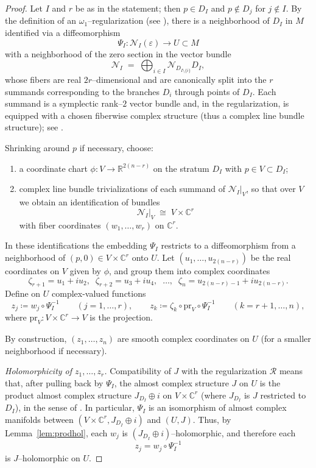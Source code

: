 \documentclass[11pt]{article}
\theoremstyle{definition}
\begin{document}
\begin{proof}
Let $I$ and $r$ be as in the statement; then $p\in D_I$ and $p\notin D_j$ for $j\notin I$.
By the definition of an $\omega_1$--regularization (see \cite[Definition~2.1]{FTZ}), there is a neighborhood of $D_I$ in $M$ identified via a diffeomorphism
\[
\Psi_I: \mathcal N_I(\varepsilon) \longrightarrow U\subset M
\]
with a neighborhood of the zero section in the vector bundle
\[
\mathcal N_I \;=\; \bigoplus_{i\in I} \mathcal N_{D_{I\setminus\{i\}}} D_I,
\]
whose fibers are real $2r$--dimensional and are canonically split into the $r$ summands corresponding to the branches $D_i$ through points of $D_I$.
Each summand is a symplectic rank--$2$ vector bundle and, in the regularization, is equipped with a chosen fiberwise complex structure (thus a complex line bundle structure); see \cite[Section~2.1]{FTZ}.

Shrinking around $p$ if necessary, choose:
\begin{enumerate}
\item a coordinate chart $\phi:V\to \mathbb R^{2(n-r)}$ on the stratum $D_I$ with $p\in V\subset D_I$;
\item complex line bundle trivializations of each summand of $\mathcal N_I|_V$,
so that over $V$ we obtain an identification of bundles
\[
\mathcal N_I|_V \;\cong\; V\times \mathbb C^r
\]
with fiber coordinates $(w_1,\dots,w_r)$ on $\mathbb C^r$.
\end{enumerate}
In these identifications the embedding $\Psi_I$ restricts to a diffeomorphism from a neighborhood of $(p,0)\in V\times \mathbb C^r$ onto $U$.
Let $(u_1,\dots,u_{2(n-r)})$ be the real coordinates on $V$ given by $\phi$, and group them into complex coordinates
\[
\zeta_{r+1}=u_1+i u_2,\;\;\zeta_{r+2}=u_3+i u_4,\;\;\dots,\;\;\zeta_n=u_{2(n-r)-1}+i u_{2(n-r)}.
\]
Define on $U$ complex-valued functions
\[
z_j \coloneqq w_j\circ \Psi_I^{-1}\qquad (j=1,\dots,r),
\qquad
z_k \coloneqq \zeta_k\circ \mathrm{pr}_V \circ \Psi_I^{-1}\qquad (k=r+1,\dots,n),
\]
where $\mathrm{pr}_V:V\times\mathbb C^r\to V$ is the projection.

By construction, $(z_1,\dots,z_n)$ are smooth complex coordinates on $U$ (for a smaller neighborhood if necessary).

\smallskip
\noindent\emph{Holomorphicity of $z_1,\dots,z_r$.}
Compatibility of $J$ with the regularization $\mathcal R$ means that, after pulling back by $\Psi_I$, the almost complex structure $J$ on $U$ is the product almost complex structure $J_{D_I}\oplus i$ on $V\times \mathbb C^r$ (where $J_{D_I}$ is $J$ restricted to $D_I$), in the sense of \cite[Definition~3.1]{FTZ}.
In particular, $\Psi_I$ is an isomorphism of almost complex manifolds between $(V\times\mathbb C^r, J_{D_I}\oplus i)$ and $(U,J)$.
Thus, by Lemma~\ref{lem:prodhol}, each $w_j$ is $(J_{D_I}\oplus i)$--holomorphic, and therefore each
\[
z_j=w_j\circ \Psi_I^{-1}
\]
is $J$--holomorphic on $U$.


\end{proof}
\end{document}
